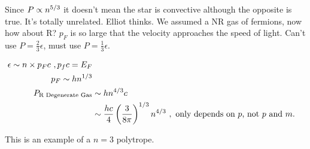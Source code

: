 Since $P \propto n^{5/3}$ it doesn't mean the star is convective although the opposite is true. It's totally unrelated. Elliot thinks. We assumed a NR gas of fermions, now how about R? $p_F$ is so large that the velocity approaches the speed of light. Can't use $P = \frac{2}{3} \epsilon$, must use $P = \frac{1}{3} \epsilon$.

\begin{align}
\epsilon \sim n \times p_F c~,p_fc = E_F\\
p_F \sim hn^{1/3}\\
P _{\text{R Degenerate Gas}}&\sim hn^{4/3}c\\
&\sim \frac{hc}{4} \left( \frac{3}{8 \pi} \right)^{1/3} n^{4/3}~,\text{ only depends on $p$, not $p$ and $m$.}
\end{align}

This is an example of a $n=3$ polytrope. 
